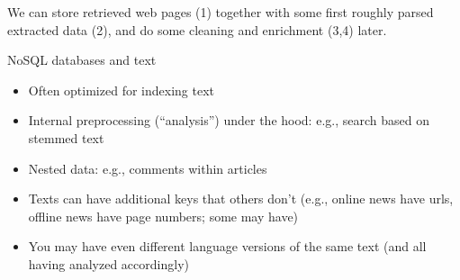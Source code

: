 \documentclass{beamer}
\begin{document}
\begin{frame}
	We can store retrieved web pages (1) together with some first roughly parsed extracted data (2), and do some cleaning and enrichment (3,4) later.
\end{frame}



\begin{frame}[<+->]{NoSQL databases and text}
	\begin{itemize}
		\item Often optimized for indexing text
		\item Internal preprocessing (``analysis'') under the hood: e.g., search based on stemmed text
		\item Nested data: e.g., comments within articles
		\item Texts can have additional keys that others don't (e.g., online news have urls, offline news have page numbers; some may have)
		\item You may have even different language versions of the same text (and all having analyzed accordingly)
	\end{itemize}
\end{frame}
\end{document}
